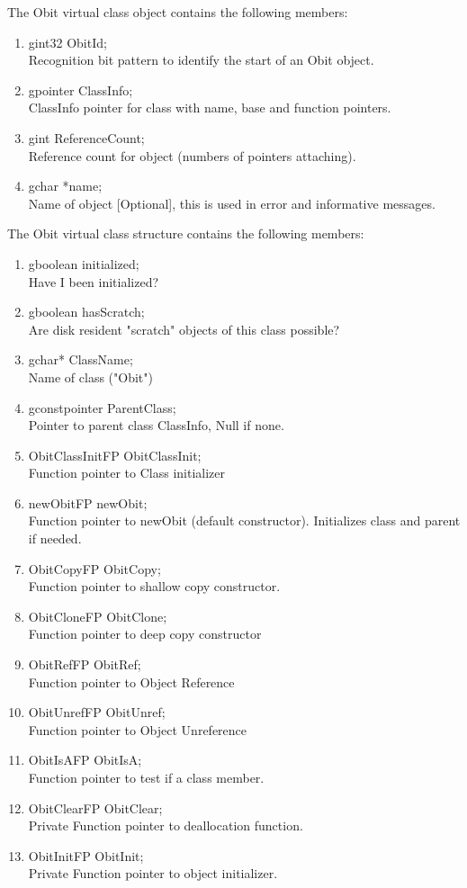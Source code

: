 \documentclass[11pt]{article}
\begin{document}
The Obit virtual class object contains the following members:
\begin{enumerate}
\item gint32 ObitId;\\
 Recognition bit pattern to identify the start of an Obit object.
\item gpointer ClassInfo;\\
ClassInfo pointer for class with name, base and function pointers.
\item gint ReferenceCount;\\
 Reference count for object (numbers of pointers attaching).
\item gchar *name;\\
 Name of object [Optional], this is used in error and informative messages.
\end{enumerate}

The Obit virtual class structure contains the following members:
\begin{enumerate}
\item gboolean initialized;\\
Have I been initialized?
\item gboolean hasScratch;\\
 Are disk resident "scratch" objects of this class possible?
\item gchar* ClassName;\\
Name of class ("Obit")
\item gconstpointer ParentClass;\\
Pointer to parent class ClassInfo, Null if none.
\item ObitClassInitFP ObitClassInit;\\
 Function pointer to Class initializer
\item newObitFP newObit;\\
Function pointer to newObit (default constructor).
Initializes class and parent if needed.
\item ObitCopyFP ObitCopy;\\
 Function pointer to shallow copy constructor.
\item ObitCloneFP ObitClone;\\
Function pointer to deep copy constructor
\item ObitRefFP ObitRef;\\
Function pointer to Object Reference
\item ObitUnrefFP ObitUnref;\\
Function pointer to Object Unreference
\item ObitIsAFP ObitIsA;\\
Function pointer to test if a class member.
\item ObitClearFP ObitClear;\\
Private Function pointer to deallocation function.
\item ObitInitFP ObitInit;\\
Private Function pointer to object initializer.
\end{enumerate}
\end{document}
